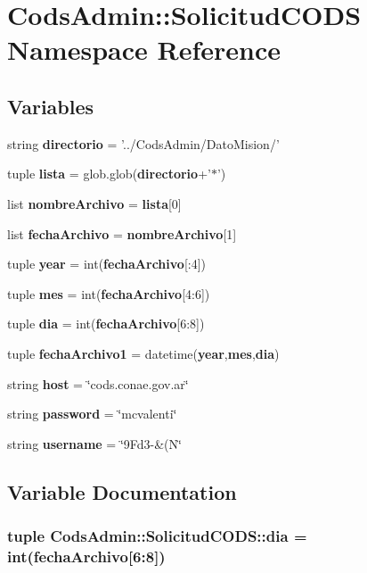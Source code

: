 \section{\-Cods\-Admin\-:\-:\-Solicitud\-C\-O\-D\-S \-Namespace \-Reference}
\label{namespace_cods_admin_1_1_solicitud_c_o_d_s}
\subsection*{\-Variables}
\begin{DoxyCompactItemize}
\item 
string {\bf directorio} = '../\-Cods\-Admin/\-Dato\-Mision/'
\item 
tuple {\bf lista} = glob.\-glob({\bf directorio}+'$\ast$')
\item 
list {\bf nombre\-Archivo} = {\bf lista}[0]
\item 
list {\bf fecha\-Archivo} = {\bf nombre\-Archivo}[1]
\item 
tuple {\bf year} = int({\bf fecha\-Archivo}[\-:4])
\item 
tuple {\bf mes} = int({\bf fecha\-Archivo}[4\-:6])
\item 
tuple {\bf dia} = int({\bf fecha\-Archivo}[6\-:8])
\item 
tuple {\bf fecha\-Archivo1} = datetime({\bf year},{\bf mes},{\bf dia})
\item 
string {\bf host} = \char`\"{}cods.\-conae.\-gov.\-ar\char`\"{}
\item 
string {\bf password} = \char`\"{}mcvalenti\char`\"{}
\item 
string {\bf username} = \char`\"{}9\-Fd3-\/\&(\-N\char`\"{}
\end{DoxyCompactItemize}


\subsection{\-Variable \-Documentation}
\subsubsection[{dia}]{\setlength{\rightskip}{0pt plus 5cm}tuple {\bf \-Cods\-Admin\-::\-Solicitud\-C\-O\-D\-S\-::dia} = int({\bf fecha\-Archivo}[6\-:8])}\label{namespace_cods_admin_1_1_solicitud_c_o_d_s_a7e2ba0af7faf4c6952227ea0870d3913}


